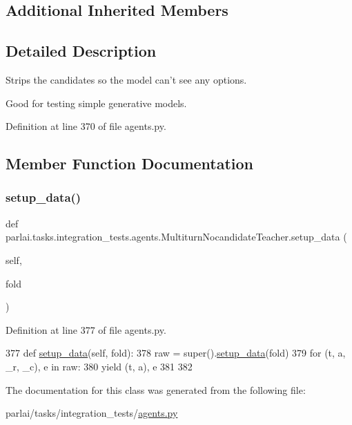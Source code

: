 \subsection*{Additional Inherited Members}


\subsection{Detailed Description}
\begin{DoxyVerb}Strips the candidates so the model can't see any options.

Good for testing simple generative models.
\end{DoxyVerb}
 

Definition at line 370 of file agents.\+py.



\subsection{Member Function Documentation}
\mbox{\label{classparlai_1_1tasks_1_1integration__tests_1_1agents_1_1MultiturnNocandidateTeacher_ac786d0ae36e1d445d68a076b8d1b8391}} 
\subsubsection{\texorpdfstring{setup\+\_\+data()}{setup\_data()}}
{\footnotesize\ttfamily def parlai.\+tasks.\+integration\+\_\+tests.\+agents.\+Multiturn\+Nocandidate\+Teacher.\+setup\+\_\+data (\begin{DoxyParamCaption}\item[{}]{self,  }\item[{}]{fold }\end{DoxyParamCaption})}



Definition at line 377 of file agents.\+py.


\begin{DoxyCode}
377     \textcolor{keyword}{def }\hyperlink{namespaceparlai_1_1tasks_1_1multinli_1_1agents_a4fa2cb0ba1ed745336ad8bceed36b841}{setup\_data}(self, fold):
378         raw = super().\hyperlink{namespaceparlai_1_1tasks_1_1multinli_1_1agents_a4fa2cb0ba1ed745336ad8bceed36b841}{setup\_data}(fold)
379         \textcolor{keywordflow}{for} (t, a, \_r, \_c), e \textcolor{keywordflow}{in} raw:
380             \textcolor{keywordflow}{yield} (t, a), e
381 
382 
\end{DoxyCode}


The documentation for this class was generated from the following file\+:\begin{DoxyCompactItemize}
\item 
parlai/tasks/integration\+\_\+tests/\hyperlink{parlai_2tasks_2integration__tests_2agents_8py}{agents.\+py}\end{DoxyCompactItemize}

